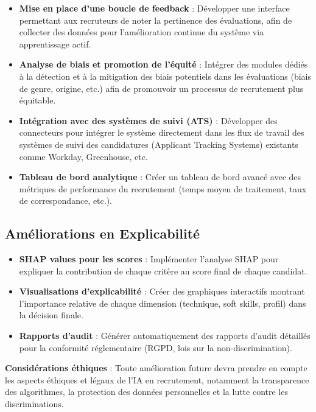 \documentclass{rapportECL}
\begin{document}
\begin{itemize}[leftmargin=*]
    \item \textbf{Mise en place d'une boucle de feedback} : Développer une interface permettant aux recruteurs de noter la pertinence des évaluations, afin de collecter des données pour l'amélioration continue du système via apprentissage actif.
    
    \item \textbf{Analyse de biais et promotion de l'équité} : Intégrer des modules dédiés à la détection et à la mitigation des biais potentiels dans les évaluations (biais de genre, origine, etc.) afin de promouvoir un processus de recrutement plus équitable.
    
    \item \textbf{Intégration avec des systèmes de suivi (ATS)} : Développer des connecteurs pour intégrer le système directement dans les flux de travail des systèmes de suivi des candidatures (Applicant Tracking Systems) existants comme Workday, Greenhouse, etc.
    
    \item \textbf{Tableau de bord analytique} : Créer un tableau de bord avancé avec des métriques de performance du recrutement (temps moyen de traitement, taux de correspondance, etc.).
\end{itemize}

\subsection{Améliorations en Explicabilité}

\begin{itemize}[leftmargin=*]
    \item \textbf{SHAP values pour les scores} : Implémenter l'analyse SHAP pour expliquer la contribution de chaque critère au score final de chaque candidat.
    
    \item \textbf{Visualisations d'explicabilité} : Créer des graphiques interactifs montrant l'importance relative de chaque dimension (technique, soft skills, profil) dans la décision finale.
    
    \item \textbf{Rapports d'audit} : Générer automatiquement des rapports d'audit détaillés pour la conformité réglementaire (RGPD, lois sur la non-discrimination).
\end{itemize}

\begin{warningbox}
\textbf{Considérations éthiques} : Toute amélioration future devra prendre en compte les aspects éthiques et légaux de l'IA en recrutement, notamment la transparence des algorithmes, la protection des données personnelles et la lutte contre les discriminations.
\end{warningbox}
\end{document}
